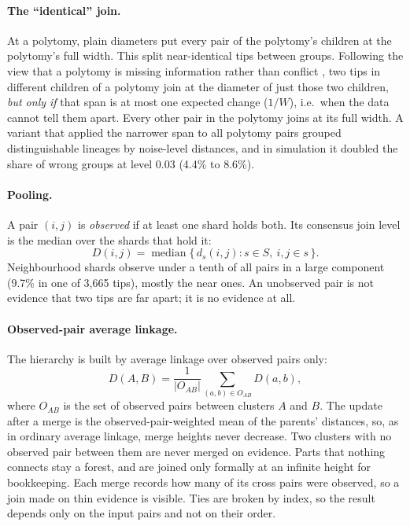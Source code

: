 \documentclass[11pt,a4paper]{article}
\begin{document}
\paragraph{The ``identical'' join.}
At a polytomy, plain diameters put every pair of the polytomy's children at the polytomy's full
width. This split near-identical tips between groups. Following the view that a polytomy is missing
information rather than conflict \citep{page2002mincut}, two tips in different children of a
polytomy join at the diameter of just those two children, \emph{but only if} that span is at most
one expected change ($1/W$), i.e.\ when the data cannot tell them apart. Every other pair in the
polytomy joins at its full width. A variant that applied the narrower span to all polytomy pairs
grouped distinguishable lineages by noise-level distances, and in simulation it doubled the share
of wrong groups at level 0.03 (4.4\% to 8.6\%).

\paragraph{Pooling.}
A pair $(i,j)$ is \emph{observed} if at least one shard holds both. Its consensus join level is the
median over the shards that hold it:
\begin{equation}
  D(i,j) = \operatorname{median}\{\, d_s(i,j) : s \in S,\ i,j \in s \,\}.
\end{equation}
Neighbourhood shards observe under a tenth of all pairs in a large component (9.7\% in one of 3,665
tips), mostly the near ones. An unobserved pair is not evidence that two tips are far apart; it is no evidence at all.

\paragraph{Observed-pair average linkage.}
The hierarchy is built by average linkage \citep{sokal1958upgma} over observed pairs only:
\begin{equation}
  D(A,B) = \frac{1}{|O_{AB}|} \sum_{(a,b) \in O_{AB}} D(a,b),
\end{equation}
where $O_{AB}$ is the set of observed pairs between clusters $A$ and $B$. The update after a merge is
the observed-pair-weighted mean of the parents' distances, so, as in ordinary average linkage,
merge heights never decrease. Two clusters with no observed pair between them are never merged on
evidence. Parts that nothing connects stay a forest, and are joined only formally at an infinite
height for bookkeeping. Each merge records how many of its cross pairs were observed, so a join made
on thin evidence is visible. Ties are broken by index, so the result depends only on the input pairs
and not on their order.
\end{document}
